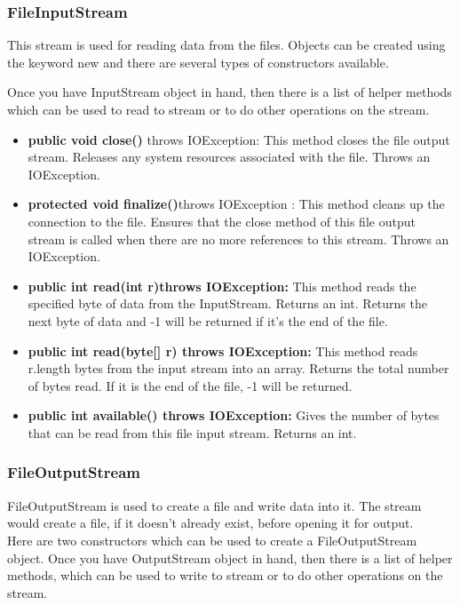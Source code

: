 \documentclass[11pt]{article}
\begin{document}
\subsubsection{FileInputStream}

This stream is used for reading data from the files. Objects can be created using the keyword new and there are several types of constructors available.

Once you have InputStream object in hand, then there is a list of helper methods which can be used to read to stream or to do other operations on the stream.

\begin{itemize}
	\item \textbf{public void close()} throws IOException{}: This method closes the file output stream. Releases any system resources associated with the file. Throws an IOException.
	\item \textbf{protected void finalize()}throws IOException {}: This method cleans up the connection to the file. Ensures that the close method of this file output stream is called when there are no more references to this stream. Throws an IOException.
	\item \textbf{public int read(int r)throws IOException{}:} This method reads the specified byte of data from the InputStream. Returns an int. Returns the next byte of data and -1 will be returned if it's the end of the file.
	\item \textbf{public int read(byte[] r) throws IOException{}:} This method reads r.length bytes from the input stream into an array. Returns the total number of bytes read. If it is the end of the file, -1 will be returned.
	\item \textbf{public int available() throws IOException{}:} Gives the number of bytes that can be read from this file input stream. Returns an int.
\end{itemize}
\subsubsection{FileOutputStream}
FileOutputStream is used to create a file and write data into it. The stream would create a file, if it doesn't already exist, before opening it for output.\\

Here are two constructors which can be used to create a FileOutputStream object. Once you have OutputStream object in hand, then there is a list of helper methods, which can be used to write to stream or to do other operations on the stream.
\end{document}
